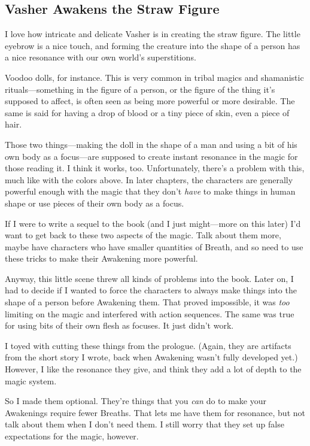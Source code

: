 \subsection*{Vasher Awakens the Straw Figure}

I love how intricate and delicate Vasher is in creating the straw figure. The little eyebrow is a nice touch, and forming the creature into the shape of a person has a nice resonance with our own world’s superstitions.

Voodoo dolls, for instance. This is very common in tribal magics and shamanistic rituals—something in the figure of a person, or the figure of the thing it’s supposed to affect, is often seen as being more powerful or more desirable. The same is said for having a drop of blood or a tiny piece of skin, even a piece of hair.

Those two things—making the doll in the shape of a man and using a bit of his own body as a focus—are supposed to create instant resonance in the magic for those reading it. I think it works, too. Unfortunately, there’s a problem with this, much like with the colors above. In later chapters, the characters are generally powerful enough with the magic that they don’t \textit{have} to make things in human shape or use pieces of their own body as a focus.

If I were to write a sequel to the book (and I just might—more on this later) I’d want to get back to these two aspects of the magic. Talk about them more, maybe have characters who have smaller quantities of Breath, and so need to use these tricks to make their Awakening more powerful.

Anyway, this little scene threw all kinds of problems into the book. Later on, I had to decide if I wanted to force the characters to always make things into the shape of a person before Awakening them. That proved impossible, it was \textit{too }limiting on the magic and interfered with action sequences. The same was true for using bits of their own flesh as focuses. It just didn’t work.

I toyed with cutting these things from the prologue. (Again, they are artifacts from the short story I wrote, back when Awakening wasn’t fully developed yet.) However, I like the resonance they give, and think they add a lot of depth to the magic system.

So I made them optional. They’re things that you \textit{can} do to make your Awakenings require fewer Breaths. That lets me have them for resonance, but not talk about them when I don’t need them. I still worry that they set up false expectations for the magic, however.



